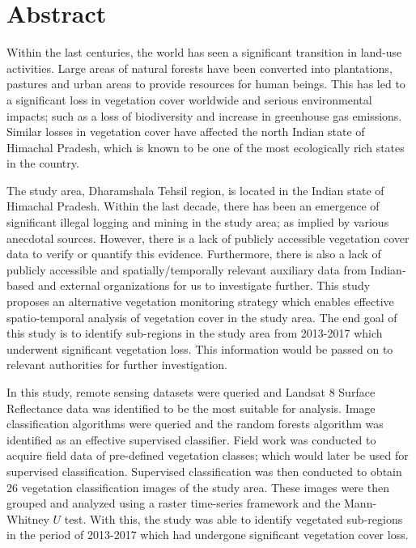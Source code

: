 \clearpage

\section*{Abstract}

\justify
Within the last centuries, the world has seen a significant transition in land-use activities. Large areas of natural forests have been converted into plantations, pastures and urban areas to provide resources for human beings. This has led to a significant loss in vegetation cover worldwide and serious environmental impacts; such as a loss of biodiversity and increase in greenhouse gas emissions. Similar losses in vegetation cover have affected the north Indian state of Himachal Pradesh, which is known to be one of the most ecologically rich states in the country.

\justify
The study area, Dharamshala Tehsil region, is located in the Indian state of Himachal Pradesh. Within the last decade, there has been an emergence of significant illegal logging and mining in the study area; as implied by various anecdotal sources. However, there is a lack of publicly accessible vegetation cover data to verify or quantify this evidence. Furthermore, there is also a lack of publicly accessible and spatially/temporally relevant auxiliary data from Indian-based and external organizations for us to investigate further. This study proposes an alternative vegetation monitoring strategy which enables effective spatio-temporal analysis of vegetation cover in the study area. The end goal of this study is to identify sub-regions in the study area from 2013-2017 which underwent significant vegetation loss. This information would be passed on to relevant authorities for further investigation.

\justify
In this study, remote sensing datasets were queried and Landsat 8 Surface Reflectance data was identified to be the most suitable for analysis. Image classification algorithms were queried and the random forests algorithm was identified as an effective supervised classifier. Field work was conducted to acquire field data of pre-defined vegetation classes; which would later be used for supervised classification. Supervised classification was then conducted to obtain 26 vegetation classification images of the study area. These images were then grouped and analyzed using a raster time-series framework and the Mann-Whitney $U$ test. With this, the study was able to identify vegetated sub-regions in the period of 2013-2017 which had undergone significant vegetation cover loss.

